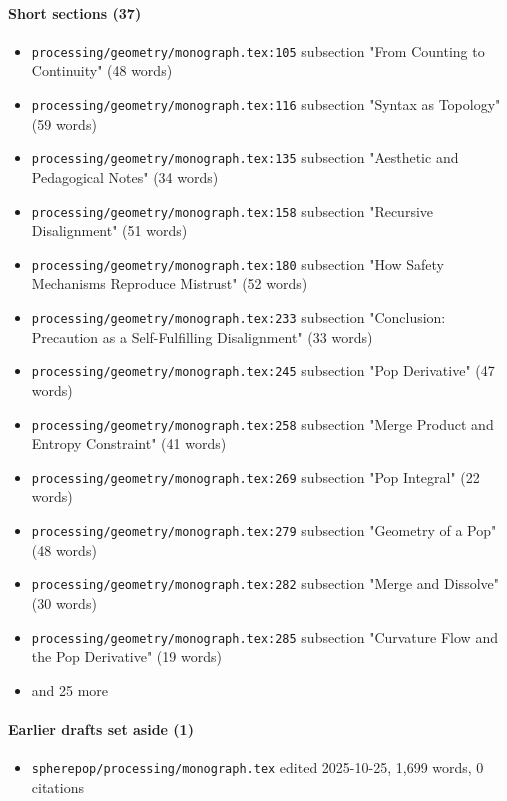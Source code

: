 \documentclass[11pt]{article}
\newcommand{\loc}[1]{{\small\color{muted}\texttt{#1}}}
\begin{document}
\paragraph{Short sections (37)}
\begin{itemize}
\item \loc{processing/\allowbreak{}geometry/\allowbreak{}monograph.tex:105} subsection "From Counting to Continuity" (48 words)
\item \loc{processing/\allowbreak{}geometry/\allowbreak{}monograph.tex:116} subsection "Syntax as Topology" (59 words)
\item \loc{processing/\allowbreak{}geometry/\allowbreak{}monograph.tex:135} subsection "Aesthetic and Pedagogical Notes" (34 words)
\item \loc{processing/\allowbreak{}geometry/\allowbreak{}monograph.tex:158} subsection "Recursive Disalignment" (51 words)
\item \loc{processing/\allowbreak{}geometry/\allowbreak{}monograph.tex:180} subsection "How Safety Mechanisms Reproduce Mistrust" (52 words)
\item \loc{processing/\allowbreak{}geometry/\allowbreak{}monograph.tex:233} subsection "Conclusion: Precaution as a Self-Fulfilling Disalignment" (33 words)
\item \loc{processing/\allowbreak{}geometry/\allowbreak{}monograph.tex:245} subsection "Pop Derivative" (47 words)
\item \loc{processing/\allowbreak{}geometry/\allowbreak{}monograph.tex:258} subsection "Merge Product and Entropy Constraint" (41 words)
\item \loc{processing/\allowbreak{}geometry/\allowbreak{}monograph.tex:269} subsection "Pop Integral" (22 words)
\item \loc{processing/\allowbreak{}geometry/\allowbreak{}monograph.tex:279} subsection "Geometry of a Pop" (48 words)
\item \loc{processing/\allowbreak{}geometry/\allowbreak{}monograph.tex:282} subsection "Merge and Dissolve" (30 words)
\item \loc{processing/\allowbreak{}geometry/\allowbreak{}monograph.tex:285} subsection "Curvature Flow and the Pop Derivative" (19 words)
\item[] {\color{muted}\small and 25 more}
\end{itemize}
\paragraph{Earlier drafts set aside (1)}
\begin{itemize}
\item \loc{spherepop/\allowbreak{}processing/\allowbreak{}monograph.tex} edited 2025-10-25, 1,699 words, 0 citations
\end{itemize}
\end{document}
